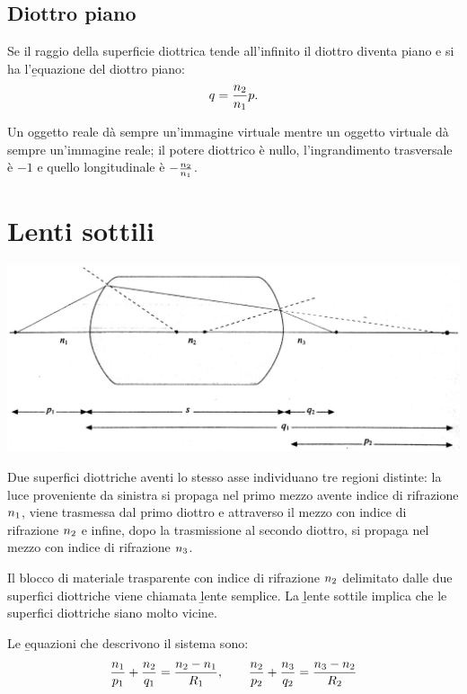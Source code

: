 \subsection{Diottro piano}
Se il raggio della superficie diottrica tende all'infinito il diottro diventa piano e si ha l'\b{equazione del diottro piano}:
\begin{equation}\begin{split}
q=\frac{n_2}{n_1}p.
\end{split}\end{equation}

Un oggetto reale dà sempre un'immagine virtuale mentre un oggetto virtuale dà sempre un'immagine reale; il potere diottrico è nullo, l'ingrandimento trasversale è $-1$ e quello longitudinale è $-\frac{n_2}{n_1}$.

\section{Lenti sottili}%
\begin{center}
\includegraphics[width=\textwidth]{immagini/lentisottili1.jpg}
\end{center}

Due superfici diottriche aventi lo stesso asse individuano tre regioni distinte: la luce proveniente da sinistra si propaga nel primo mezzo avente indice di rifrazione $n_1$, viene trasmessa dal primo diottro e attraverso il mezzo con indice di rifrazione $n_2$ e infine, dopo la trasmissione al secondo diottro, si propaga nel mezzo con indice di rifrazione $n_3$.

Il blocco di materiale trasparente con indice di rifrazione $n_2$ delimitato dalle due superfici diottriche viene chiamata \b{lente semplice}. La \b{lente sottile} implica che le superfici diottriche siano molto vicine.

Le \b{equazioni che descrivono il sistema} sono:
\begin{equation}\begin{split}
\frac{n_1}{p_1}+\frac{n_2}{q_1}=\frac{n_2-n_1}{R_1}, \qquad \frac{n_2}{p_2}+\frac{n_3}{q_2}=\frac{n_3-n_2}{R_2}
\end{split}\end{equation}


